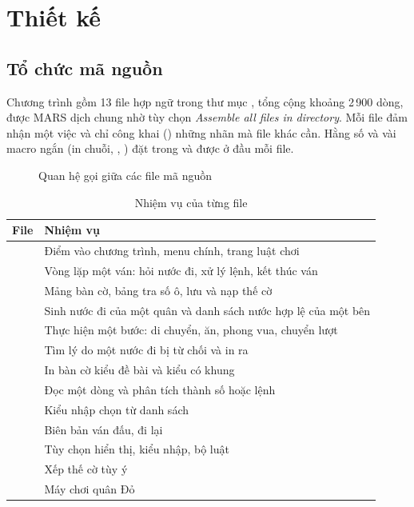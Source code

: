 \chapter{Thiết kế}

\section{Tổ chức mã nguồn}

Chương trình gồm 13 file hợp ngữ trong thư mục , tổng cộng khoảng 2\,900 dòng, được MARS dịch chung nhờ tùy chọn \emph{Assemble all files in directory}. Mỗi file đảm nhận một việc và chỉ công khai () những nhãn mà file khác cần. Hằng số và vài macro ngắn (in chuỗi, , ) đặt trong  và được  ở đầu mỗi file.

\begin{figure}[ht]
\centering

\caption{Quan hệ gọi giữa các file mã nguồn}\label{fig:modules}
\end{figure}

\begin{table}[ht]
\centering\small
\caption{Nhiệm vụ của từng file}\label{tab:modules}
\begin{tabularx}{\textwidth}{@{}lL@{}}
\toprule
File & Nhiệm vụ \\
\midrule
{} & Điểm vào chương trình, menu chính, trang luật chơi \\
 & Vòng lặp một ván: hỏi nước đi, xử lý lệnh, kết thúc ván \\
 & Mảng bàn cờ, bảng tra số ô, lưu và nạp thế cờ \\
 & Sinh nước đi của một quân và danh sách nước hợp lệ của một bên \\
 & Thực hiện một bước: di chuyển, ăn, phong vua, chuyển lượt \\
 & Tìm lý do một nước đi bị từ chối và in ra \\
 & In bàn cờ kiểu đề bài và kiểu có khung \\
 & Đọc một dòng và phân tích thành số hoặc lệnh \\
 & Kiểu nhập chọn từ danh sách \\
 & Biên bản ván đấu, đi lại \\
 & Tùy chọn hiển thị, kiểu nhập, bộ luật \\
 & Xếp thế cờ tùy ý \\
 & Máy chơi quân Đỏ \\
\bottomrule
\end{tabularx}
\end{table}

